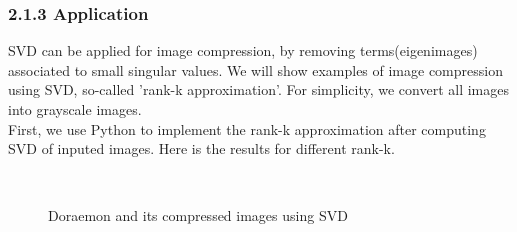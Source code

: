 \documentclass[12pt]{article}
\begin{document}
\subsubsection*{2.1.3 \quad Application}
SVD can be applied for image compression, by removing terms(eigenimages) associated to small singular values.
We will show examples of image compression using SVD, so-called 'rank-k approximation'. For simplicity, we convert
all images into grayscale images.\\
First, we use Python to implement the rank-k approximation after computing SVD of inputed images. Here is the results for
different rank-k.
\begin{figure}[H]
    \centering
    \\
    \caption{Doraemon and its compressed images using SVD}
    \label{ref_label_overall}
\end{figure}
\end{document}
